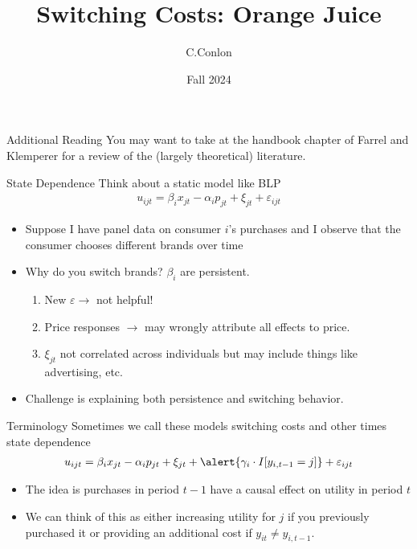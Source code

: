 

\title [Dynamic Oligopoly I]{Switching Costs: Orange Juice}
\author{C.Conlon }
\date{Fall 2024}


\begin{frame}
\titlepage
\end{frame}


\begin{frame}{Additional Reading}
You may want to take at the handbook chapter of Farrel and Klemperer for a review of the (largely theoretical) literature.

\end{frame}
\begin{frame}{State Dependence}
Think about a static model like BLP
\begin{eqnarray*}
u_{ijt} = \beta_i x_{jt} - \alpha_i p_{jt} + \xi_{jt} + \varepsilon_{ijt}
\end{eqnarray*}
\begin{itemize}
\item Suppose I have panel data on consumer $i$'s purchases and I observe that the consumer chooses different brands over time
\item Why do you switch brands?  $\beta_i$ are persistent.
\begin{enumerate}
\item New $\varepsilon \rightarrow$ not helpful!
\item Price responses $\rightarrow$ may wrongly attribute all effects to price.
\item $\xi_{jt}$ not correlated across individuals but may include things like advertising, etc.
\end{enumerate}
\item Challenge is explaining both \alert{persistence} and \alert{switching} behavior.
\end{itemize}
\end{frame} 



\begin{frame}{Terminology}
Sometimes we call these models \alert{switching costs} and other times \alert{state dependence}
\begin{eqnarray*}
u_{ijt} = \beta_i x_{jt} - \alpha_i p_{jt} + \xi_{jt} + \alert{\gamma_i \cdot I[y_{i,t-1}=j]} + \varepsilon_{ijt} 
\end{eqnarray*}
\begin{itemize}
\item The idea is purchases in period $t-1$ have a causal effect on utility in period $t$
\item We can think of this as either increasing utility for $j$ if you previously purchased it or providing an additional cost if $y_{it} \neq y_{i,t-1}$.
\end{itemize}
\end{frame} 


